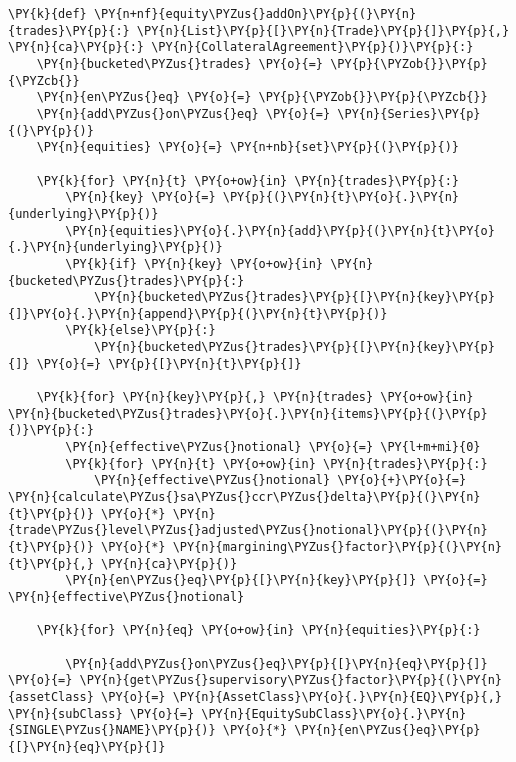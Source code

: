     \begin{tcolorbox}[breakable, size=fbox, boxrule=1pt, pad at break*=1mm,colback=cellbackground, colframe=cellborder]
\begin{Verbatim}[commandchars=\\\{\}]
\PY{k}{def} \PY{n+nf}{equity\PYZus{}addOn}\PY{p}{(}\PY{n}{trades}\PY{p}{:} \PY{n}{List}\PY{p}{[}\PY{n}{Trade}\PY{p}{]}\PY{p}{,} \PY{n}{ca}\PY{p}{:} \PY{n}{CollateralAgreement}\PY{p}{)}\PY{p}{:}
    \PY{n}{bucketed\PYZus{}trades} \PY{o}{=} \PY{p}{\PYZob{}}\PY{p}{\PYZcb{}}
    \PY{n}{en\PYZus{}eq} \PY{o}{=} \PY{p}{\PYZob{}}\PY{p}{\PYZcb{}}
    \PY{n}{add\PYZus{}on\PYZus{}eq} \PY{o}{=} \PY{n}{Series}\PY{p}{(}\PY{p}{)}
    \PY{n}{equities} \PY{o}{=} \PY{n+nb}{set}\PY{p}{(}\PY{p}{)}
    
    \PY{k}{for} \PY{n}{t} \PY{o+ow}{in} \PY{n}{trades}\PY{p}{:}
        \PY{n}{key} \PY{o}{=} \PY{p}{(}\PY{n}{t}\PY{o}{.}\PY{n}{underlying}\PY{p}{)}
        \PY{n}{equities}\PY{o}{.}\PY{n}{add}\PY{p}{(}\PY{n}{t}\PY{o}{.}\PY{n}{underlying}\PY{p}{)}
        \PY{k}{if} \PY{n}{key} \PY{o+ow}{in} \PY{n}{bucketed\PYZus{}trades}\PY{p}{:}
            \PY{n}{bucketed\PYZus{}trades}\PY{p}{[}\PY{n}{key}\PY{p}{]}\PY{o}{.}\PY{n}{append}\PY{p}{(}\PY{n}{t}\PY{p}{)}
        \PY{k}{else}\PY{p}{:}
            \PY{n}{bucketed\PYZus{}trades}\PY{p}{[}\PY{n}{key}\PY{p}{]} \PY{o}{=} \PY{p}{[}\PY{n}{t}\PY{p}{]}
            
    \PY{k}{for} \PY{n}{key}\PY{p}{,} \PY{n}{trades} \PY{o+ow}{in} \PY{n}{bucketed\PYZus{}trades}\PY{o}{.}\PY{n}{items}\PY{p}{(}\PY{p}{)}\PY{p}{:}
        \PY{n}{effective\PYZus{}notional} \PY{o}{=} \PY{l+m+mi}{0}
        \PY{k}{for} \PY{n}{t} \PY{o+ow}{in} \PY{n}{trades}\PY{p}{:}
            \PY{n}{effective\PYZus{}notional} \PY{o}{+}\PY{o}{=} \PY{n}{calculate\PYZus{}sa\PYZus{}ccr\PYZus{}delta}\PY{p}{(}\PY{n}{t}\PY{p}{)} \PY{o}{*} \PY{n}{trade\PYZus{}level\PYZus{}adjusted\PYZus{}notional}\PY{p}{(}\PY{n}{t}\PY{p}{)} \PY{o}{*} \PY{n}{margining\PYZus{}factor}\PY{p}{(}\PY{n}{t}\PY{p}{,} \PY{n}{ca}\PY{p}{)}
        \PY{n}{en\PYZus{}eq}\PY{p}{[}\PY{n}{key}\PY{p}{]} \PY{o}{=} \PY{n}{effective\PYZus{}notional}
        
    \PY{k}{for} \PY{n}{eq} \PY{o+ow}{in} \PY{n}{equities}\PY{p}{:}
        
        \PY{n}{add\PYZus{}on\PYZus{}eq}\PY{p}{[}\PY{n}{eq}\PY{p}{]} \PY{o}{=} \PY{n}{get\PYZus{}supervisory\PYZus{}factor}\PY{p}{(}\PY{n}{assetClass} \PY{o}{=} \PY{n}{AssetClass}\PY{o}{.}\PY{n}{EQ}\PY{p}{,} \PY{n}{subClass} \PY{o}{=} \PY{n}{EquitySubClass}\PY{o}{.}\PY{n}{SINGLE\PYZus{}NAME}\PY{p}{)} \PY{o}{*} \PY{n}{en\PYZus{}eq}\PY{p}{[}\PY{n}{eq}\PY{p}{]}
    

\end{Verbatim}
\end{tcolorbox}
